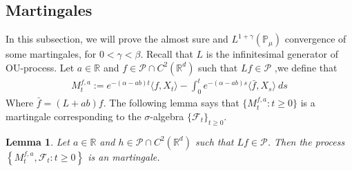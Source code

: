 \documentclass[12pt, a4paper]{amsart}
\newtheorem{lem}[thm]{Lemma}
\theoremstyle{definition}
\numberwithin{equation}{section}
\begin{document}
\subsection{Martingales}
In this subsection, we will prove the almost sure and $L^{1+\gamma}(\mathbb{P}_{\mu})$ convergence of some martingales, for $0<\gamma<\beta$. Recall that $L$ is the infinitesimal generator of OU-process. Let $a\in \mathbb{R}$ and $f\in \mathcal{P}\cap C^2(\mathbb{R}^d)$ such that $Lf \in \mathcal{P}$ ,we define that
\begin{align}
\label{defmartingale}
  M_t^{f,a}:=e^{-(\alpha-ab)t}\langle f,X_t\rangle-\int_0^t e^{-(\alpha-ab)s}\langle \bar{f}, X_s\rangle~ ds
\end{align}
Where $\bar{f}=(L+ab)f$. The following lemma says that $\{M_t^{f,a}: t\geq 0\}$ is a martingale corresponding to the $\sigma$-algebra $\{\mathcal{F}_t\}_{t\geq 0}$.
\begin{lem}\label{lemma25}
Let $a\in \mathbb{R}$ and $h\in \mathcal{P}\cap C^2(\mathbb{R}^d)$ such that $Lf \in \mathcal{P}$. Then the process $\left\{M_t^{f,a}, \mathcal{F}_t:t\geq 0\right\}$ is an martingale.
\end{lem}
\end{document}
